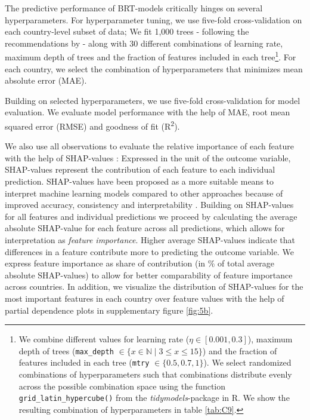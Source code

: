 \documentclass[12pt, a4paper]{article}
\begin{document}
The predictive performance of BRT-models critically hinges on several hyperparameters. For hyperparameter tuning, we use five-fold cross-validation on each country-level subset of data; We fit 1,000 trees - following the recommendations by \textcite{Elith.2008} - along with 30 different combinations of learning rate, maximum depth of trees and the fraction of features included in each tree\footnote{We combine different values for learning rate ($\eta \in [0.001,0.3]$), maximum depth of trees (\texttt{max\_depth} $\in \{x \in \mathbb{N} \mid 3  \leq x \leq 15 \}$) and the fraction of features included in each tree (\texttt{mtry} $\in \{0.5,0.7,1\}$). We select randomized combinations of hyperparameters such that combinations distribute evenly across the possible combination space using the function \texttt{grid\_latin\_hypercube()} from the \textit{tidymodels}-package in R. We show the resulting combination of hyperparameters in table \ref{tab:C9}.}. For each country, we select the combination of hyperparameters that minimizes mean absolute error (MAE).

Building on selected hyperparameters, we use five-fold cross-validation for model evaluation. We evaluate model performance with the help of MAE, root mean squared error (RMSE) and goodness of fit (R\textsuperscript{2}). 

We also use all observations to evaluate the relative importance of each feature with the help of SHAP-values \autocite{Lundberg.2017}: Expressed in the unit of the outcome variable, SHAP-values represent the contribution of each feature to each individual prediction. SHAP-values have been proposed as a more suitable means to interpret machine learning models compared to other approaches because of improved accuracy, consistency and interpretability \autocite{Lundberg.2020}. Building on SHAP-values for all features and individual predictions we proceed by calculating the average absolute SHAP-value for each feature across all predictions, which allows for interpretation as \textit{feature importance}. Higher average SHAP-values indicate that differences in a feature contribute more to predicting the outcome variable. We express feature importance as share of contribution (in \% of total average absolute SHAP-values) to allow for better comparability of feature importance across countries. In addition, we visualize the distribution of SHAP-values for the most important features in each country over feature values with the help of partial dependence plots in supplementary figure \ref{fig:5b}. 
\end{document}
